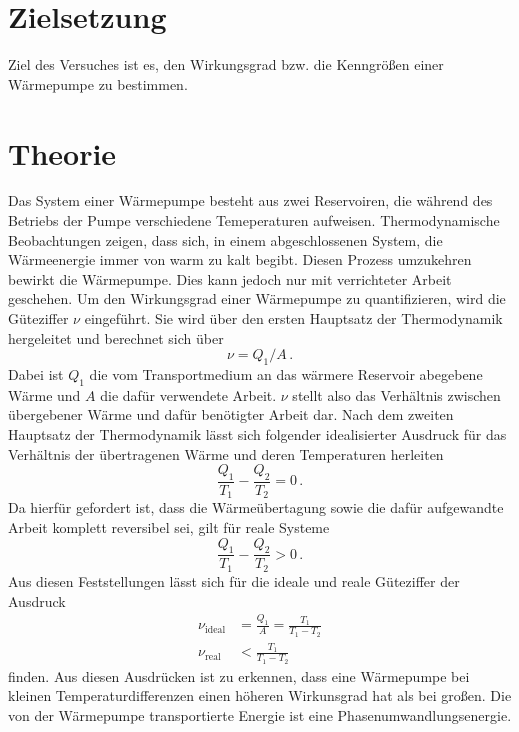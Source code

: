 \section{Zielsetzung}
Ziel des Versuches ist es, den Wirkungsgrad bzw. die Kenngrößen 
einer Wärmepumpe zu bestimmen.
\section{Theorie}
\label{sec:Theorie}

Das System einer Wärmepumpe besteht aus zwei Reservoiren, die 
während des Betriebs der Pumpe verschiedene Temeperaturen aufweisen.
Thermodynamische Beobachtungen zeigen, dass sich, in einem abgeschlossenen
System, die Wärmeenergie immer von warm zu kalt begibt. Diesen
Prozess umzukehren bewirkt die Wärmepumpe. Dies kann jedoch nur mit 
verrichteter Arbeit geschehen. Um den Wirkungsgrad einer Wärmepumpe 
zu quantifizieren, wird die Güteziffer $\nu$ eingeführt. Sie wird 
über den ersten Hauptsatz der Thermodynamik hergeleitet und berechnet 
sich über 
\begin{equation}
    \nu=Q_1/A\,.
\end{equation}
Dabei ist $Q_1$ die vom Transportmedium an das wärmere Reservoir abegebene
Wärme und $A$ die dafür verwendete Arbeit. $\nu$ stellt also das Verhältnis 
zwischen übergebener Wärme und dafür benötigter Arbeit dar. Nach dem zweiten
Hauptsatz der Thermodynamik lässt sich folgender idealisierter Ausdruck für 
das Verhältnis der übertragenen Wärme und deren Temperaturen herleiten 
\begin{equation}
    \frac{Q_1}{T_1}-\frac{Q_2}{T_2}=0\,.
\end{equation}
Da hierfür gefordert ist, dass die Wärmeübertagung sowie die dafür aufgewandte
Arbeit komplett reversibel sei, gilt für reale Systeme 
\begin{equation}
    \frac{Q_1}{T_1}-\frac{Q_2}{T_2}>0\,.
\end{equation}
Aus diesen Feststellungen lässt sich für die ideale und reale Güteziffer der 
Ausdruck 
\begin{align}
    \nu_\text{ideal}&=\frac{Q_1}{A}=\frac{T_1}{T_1-T_2} \label{eq:Gueteideal}\\
    \nu_\text{real}&<\frac{T_1}{T_1-T_2}
\end{align}
finden. Aus diesen Ausdrücken ist zu erkennen, dass eine Wärmepumpe bei kleinen 
Temperaturdifferenzen einen höheren Wirkunsgrad hat als bei großen.
Die von der Wärmepumpe transportierte Energie ist eine Phasenumwandlungsenergie. 
